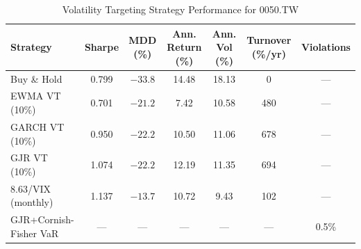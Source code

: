 \begin{table}[H]
\centering
\caption{Volatility Targeting Strategy Performance for 0050.TW}
\label{tab:vt_results}
\begin{tabular}{lcccccc}
\toprule
Strategy & Sharpe & MDD (\%) & Ann. Return (\%) & Ann. Vol (\%) & Turnover (\%/yr) & Violations \\
\midrule
Buy \& Hold & 0.799 & $-33.8$ & 14.48 & 18.13 & 0 & --- \\ %
EWMA VT (10\%) & 0.701 & $-21.2$ & 7.42 & 10.58 & 480 & --- \\ %
GARCH VT (10\%) & 0.950 & $-22.2$ & 10.50 & 11.06 & 678 & --- \\ %
GJR VT (10\%) & 1.074 & $-22.2$ & 12.19 & 11.35 & 694 & --- \\ %
8.63/VIX (monthly) & 1.137 & $-13.7$ & 10.72 & 9.43 & 102 & --- \\ %
GJR+Cornish-Fisher VaR & --- & --- & --- & --- & --- & 0.5\% \\ %
\bottomrule
\end{tabular}
\begin{flushleft}

\end{flushleft}
\end{table}
